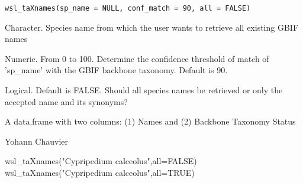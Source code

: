 \documentclass[a4paper]{book}
\begin{document}
%
\begin{Usage}
\begin{verbatim}
wsl_taXnames(sp_name = NULL, conf_match = 90, all = FALSE)
\end{verbatim}
\end{Usage}
%
\begin{Arguments}
\begin{ldescription}
\item[\code{sp\_name}] Character. Species name from which the user wants to retrieve all existing GBIF names

\item[\code{conf\_match}] Numeric. From 0 to 100. Determine the confidence
threshold of match of 'sp\_name' with the GBIF backbone taxonomy. Default is 90.

\item[\code{all}] Logical. Default is FALSE. Should all species names be retrieved or only
the accepted name and its synonyms?
\end{ldescription}
\end{Arguments}
%
\begin{Value}
A data.frame with two columns: (1) Names and (2) Backbone Taxonomy Status
\end{Value}
%
\begin{Author}\relax
Yohann Chauvier
\end{Author}
%
\begin{Examples}
\begin{ExampleCode}
wsl_taXnames("Cypripedium calceolus",all=FALSE)
wsl_taXnames("Cypripedium calceolus",all=TRUE)

\end{ExampleCode}
\end{Examples}
\printindex{}
\end{document}
